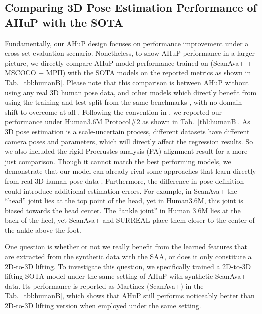 \documentclass[twocolumn]{svjour3}          \smartqed  \usepackage{graphicx}
\newcommand{\tabref}[1]{Tab.~\ref{#1}}
\begin{document}
\subsection{Comparing 3D Pose Estimation Performance of AHuP with the SOTA}
Fundamentally, our  AHuP design focuses on performance improvement under a cross-set evaluation scenario.  Nonetheless, to show AHuP performance in a larger picture, we directly compare AHuP model performance trained on (ScanAva+ + MSCOCO + MPII) with the SOTA models  on the reported metrics as shown in \tabref{tbl:humanB}.
Please note that this  comparison is between AHuP without using any real 3D human pose data, and other models  which  directly benefit from using the training and test split from the same benchmarks \cite{h36m_pami,singleshotmultiperson2018}, with no domain shift to overcome at all \cite{sun2018integral,yasin2016dual,moon2019camera}. 
Following the convention in \cite{moon2019camera}, we reported our performance under Human3.6M Protocol\#2 as shown in \tabref{tbl:humanB}. As 3D pose estimation is a scale-uncertain process, different datasets have different camera poses and parameters, 
which will directly affect the  regression results. So we also included the  rigid Procrustes analysis (PA) alignment \cite{gower1975generalized} result for a  more just comparison. 
Though it cannot match the best performing models, we demonstrate that our model can already rival some approaches that learn directly from real 3D human pose data  \cite{yasin2016dual,chen20173d}. 
Furthermore, the difference in pose definition could  introduce additional estimation errors.
For example, in ScanAva+ the ``head'' joint lies at the top point of the head, yet in Human3.6M, this joint is biased towards the head center. The ``ankle joint'' in Human 3.6M lies at the back of the heel, yet ScanAva+ and SURREAL place them closer to the center of the ankle above the foot. 


One question is whether or not  we really benefit from the learned features that are extracted from the synthetic data with the SAA, or does it only constitute a 2D-to-3D lifting. To investigate this question, we specifically trained a  2D-to-3D lifting SOTA model \cite{martinez2017simple} under the same setting of AHuP with synthetic ScanAva+ data. Its performance is reported as Martinez (ScanAva+) in the \tabref{tbl:humanB}, which shows that AHuP still performs noticeably better than 2D-to-3D lifting version when employed under the same setting.  
\end{document}
